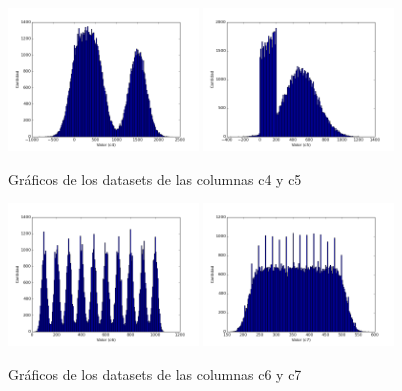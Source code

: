 \begin{figure}[h!]
  \centering
  \includegraphics[width=0.45\textwidth]{./../source/datasets/img/c4}
  \includegraphics[width=0.45\textwidth]{./../source/datasets/img/c5}
  \caption{Gráficos de los datasets de las columnas c4 y c5}
 \end{figure}
 
 
\begin{figure}[h!]
  \centering
  \includegraphics[width=0.45\textwidth]{./../source/datasets/img/c6}
  \includegraphics[width=0.45\textwidth]{./../source/datasets/img/c7}
  \caption{Gráficos de los datasets de las columnas c6 y c7}
 \end{figure}
 

